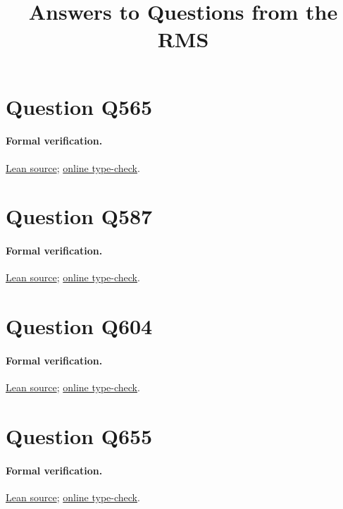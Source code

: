 \documentclass[11pt]{article}
\title{Answers to Questions from the RMS}
\author{}
\date{}
\begin{document}
\maketitle
\tableofcontents

\section{Question Q565}

\paragraph{Formal verification.}
\href{https://github.com/l-pommeret/rms-math-proofs/tree/19dff5d600f7cafa7d6869e84ec0b8d8a49deb12/lean/RMS}{Lean source}; \href{https://github.com/l-pommeret/rms-math-proofs/actions/runs/31286519942}{online type-check}.

\section{Question Q587}

\paragraph{Formal verification.}
\href{https://github.com/l-pommeret/rms-math-proofs/blob/888ec43373d3d5bf1820dbc45a1ceba4368446fe/lean/RMS/Q587IntervalMain.lean}{Lean source}; \href{https://github.com/l-pommeret/rms-math-proofs/actions/runs/31314840420}{online type-check}.

\section{Question Q604}

\paragraph{Formal verification.}
\href{https://github.com/l-pommeret/rms-math-proofs/blob/dd59384b5ec727517bb95dc69f583e2dd565b5e7/lean/RMS/Q604.lean}{Lean source}; \href{https://github.com/l-pommeret/rms-math-proofs/actions/runs/31279584230}{online type-check}.

\section{Question Q655}

\paragraph{Formal verification.}
\href{https://github.com/l-pommeret/rms-math-proofs/blob/2ccce02bc68c0c0e5037cb585e030fa27c9adf7d/lean/RMS/Q655Stage7.lean}{Lean source}; \href{https://github.com/l-pommeret/rms-math-proofs/actions/runs/31319168720}{online type-check}.
\end{document}
